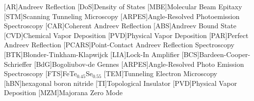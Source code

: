 [AR]{Andreev Reflection}
[DoS]{Density of States}
[MBE]{Molecular Beam Epitaxy}
[STM]{Scanning Tunneling Microscopy}
[ARPES]{Angle-Resolved Photoemission Spectroscopy}
[CAR]{Coherent Andreev Reflection}
[ABS]{Andreev Bound State}
[CVD]{Chemical Vapor Deposition}
[PVD]{Physical Vapor Deposition}
[PAR]{Perfect Andreev Reflection}
[PCARS]{Point-Contact Andreev Reflection Spectroscopy}
[BTK]{Blonder-Tinkham-Klapwijck}
[LIA]{Lock-In Amplifier}
[BCS]{Bardeen-Cooper-Schrieffer}
[BdG]{Bogoliubov-de Gennes}
[ARPES]{Angle-Resolved Photo Emission Spectroscopy}
[FTS]{FeTe$_{0.45}$Se$_{0.55}$}
[TEM]{Tunneling Electron Microscopy}
[hBN]{hexagonal boron nitride}
[TI]{Topological Insulator}
[PVD]{Physical Vapor Deposition}
[MZM]{Majorana Zero Mode}